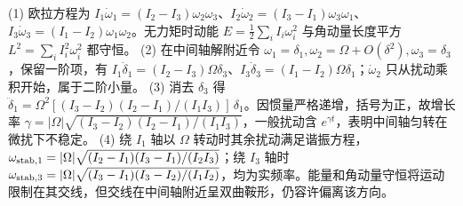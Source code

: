 (1) 欧拉方程为 \(I_1\dot\omega_1=(I_2-I_3)\omega_2\omega_3\)、\(I_2\dot\omega_2=(I_3-I_1)\omega_3\omega_1\)、\(I_3\dot\omega_3=(I_1-I_2)\omega_1\omega_2\)。无力矩时动能 \(E=\frac12\sum_iI_i\omega_i^2\) 与角动量长度平方 \(L^2=\sum_i I_i^2\omega_i^2\) 都守恒。
(2) 在中间轴解附近令 \(\omega_1=\delta_1,\omega_2=\Omega+O(\delta^2),\omega_3=\delta_3\)，保留一阶项，有 \(I_1\dot\delta_1=(I_2-I_3)\Omega\delta_3\)、\(I_3\dot\delta_3=(I_1-I_2)\Omega\delta_1\)；\(\dot\omega_2\) 只从扰动乘积开始，属于二阶小量。
(3) 消去 \(\delta_3\) 得 \(\ddot\delta_1=\Omega^2[(I_3-I_2)(I_2-I_1)/(I_1I_3)]\,\delta_1\)。因惯量严格递增，括号为正，故增长率 \(\gamma=|\Omega|\sqrt{(I_3-I_2)(I_2-I_1)/(I_1I_3)}\)，一般扰动含 \(e^{\gamma t}\)，表明中间轴匀转在微扰下不稳定。
(4) 绕 \(I_1\) 轴以 \(\Omega\) 转动时其余扰动满足谐振方程，\(\omega_{\rm stab,1}=|\Omega|\sqrt{(I_2-I_1)(I_3-I_1)/(I_2I_3)}\)；绕 \(I_3\) 轴时 \(\omega_{\rm stab,3}=|\Omega|\sqrt{(I_3-I_1)(I_3-I_2)/(I_1I_2)}\)，均为实频率。能量和角动量守恒将运动限制在其交线，但交线在中间轴附近呈双曲鞍形，仍容许偏离该方向。
